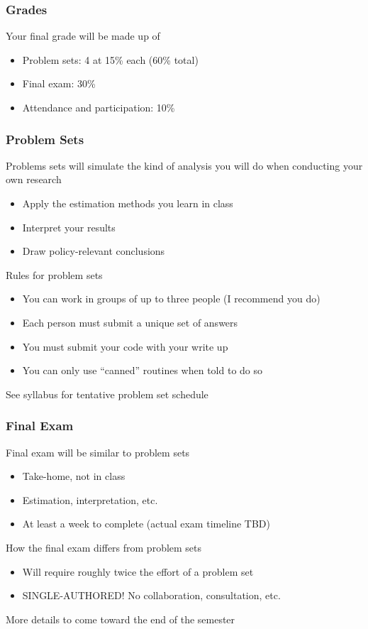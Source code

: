 \documentclass{beamer}
\begin{document}
\begin{frame}\frametitle{Grades}
    Your final grade will be made up of
    \begin{itemize}
        \item Problem sets: 4 at 15\% each (60\% total)
        \item Final exam: 30\%
        \item Attendance and participation: 10\%
    \end{itemize}
\end{frame}

\begin{frame}\frametitle{Problem Sets}
    Problems sets will simulate the kind of analysis you will do when conducting your own research
    \begin{itemize}
        \item Apply the estimation methods you learn in class
        \item Interpret your results
        \item Draw policy-relevant conclusions
    \end{itemize}
    \vspace{3ex}
    Rules for problem sets
    \begin{itemize}
        \item You can work in groups of up to three people (I recommend you do)
        \item Each person must submit a unique set of answers
        \item You must submit your code with your write up
        \item You can only use ``canned'' routines when told to do so
    \end{itemize}
    \vspace{3ex}
    See syllabus for tentative problem set schedule
\end{frame}

\begin{frame}\frametitle{Final Exam}
    Final exam will be similar to problem sets
    \begin{itemize}
        \item Take-home, not in class
        \item Estimation, interpretation, etc.
        \item At least a week to complete (actual exam timeline TBD)
    \end{itemize}
    \vspace{3ex}
    How the final exam differs from problem sets
    \begin{itemize}
        \item Will require roughly twice the effort of a problem set
        \item SINGLE-AUTHORED! No collaboration, consultation, etc.
    \end{itemize}
    \vspace{3ex}
    More details to come toward the end of the semester
\end{frame}
\end{document}
